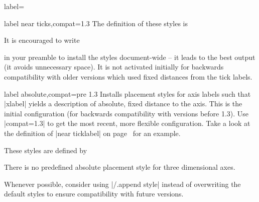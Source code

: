 \begin{pgfplotsxykey}{\x label=}
\begin{pgfplotsxykeylist}{\x label near ticks,compat=1.3}
	The definition of these styles is
\begin{codeexample}
\end{codeexample}
	
	It is encouraged to write
\begin{codeexample}
\pgfplotsset{compat=1.3}
\end{codeexample}
	\noindent in your preamble to install the styles document-wide -- it leads to the best output (it avoids unnecessary space). It is not activated initially for backwards compatibility with older versions which used fixed distances from the tick labels.
\end{pgfplotsxykeylist}

\begin{pgfplotsxykeylist}{\x label absolute,compat=pre 1.3}
	Installs placement styles for axis labels such that |xlabel| yields a description of absolute, fixed distance to the axis. This is the initial configuration (for backwards compatibility with versions before 1.3). Use |compat=1.3| to get the most recent, more flexible configuration. Take a look at the definition of |near ticklabel| on page~\pageref{key:near:ticklabel} for an example.

	These styles are defined by
\begin{codeexample}
\end{codeexample}

	There is no predefined absolute placement style for three dimensional axes.
\end{pgfplotsxykeylist}

Whenever possible, consider using |/.append style| instead of overwriting the default styles to ensure compatibility with future versions.
\begin{codeexample}
\end{codeexample}
\end{pgfplotsxykey}

